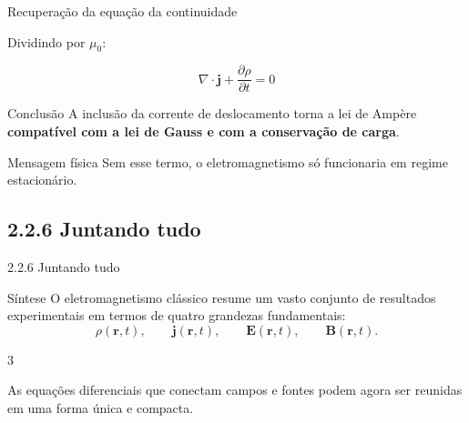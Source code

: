 \documentclass[aspectratio=169]{beamer}
\begin{document}
\begin{frame}{Recuperação da equação da continuidade}
\small

Dividindo por \(\mu_0\):

\begin{equation}
\nabla\cdot \mathbf{j}
+
\frac{\partial \rho}{\partial t}
=0
\label{eq:continuity_final}
\end{equation}

\vspace{0.2cm}

\begin{alertblock}{Conclusão}
A inclusão da corrente de deslocamento torna a lei de Ampère
\textbf{compatível com a lei de Gauss e com a conservação de carga}.
\end{alertblock}

\vspace{0.1cm}

\begin{block}{Mensagem física}
Sem esse termo, o eletromagnetismo só funcionaria em regime estacionário.
\end{block}

\end{frame}




\subsection{2.2.6 Juntando tudo}

\begin{frame}{2.2.6 Juntando tudo}
\begin{block}{Síntese}
O eletromagnetismo clássico resume um vasto conjunto de resultados experimentais em termos de quatro grandezas fundamentais:
\[
\rho(\mathbf{r},t),\qquad
\mathbf{j}(\mathbf{r},t),\qquad
\mathbf{E}(\mathbf{r},t),\qquad
\mathbf{B}(\mathbf{r},t).
\]
\end{block}

\vspace{0.2cm}3

As equações diferenciais que conectam campos e fontes podem agora ser reunidas em uma forma única e compacta.
\end{frame}
\end{document}
